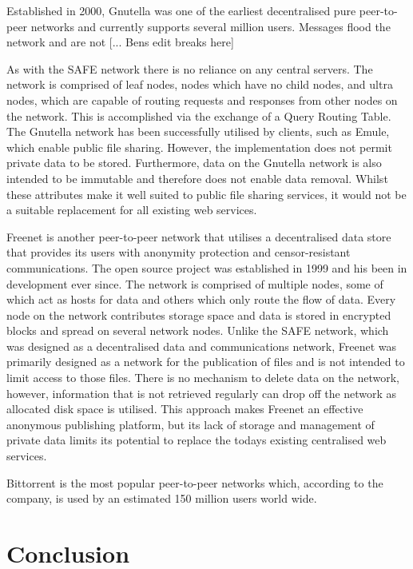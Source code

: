 \documentclass[twocolumn,english]{article}
\begin{document}
Established in 2000, Gnutella was one of the earliest decentralised pure peer-to-peer networks and currently supports several million users.  Messages flood the network and are not [... Bens edit breaks here]

As with the SAFE network there is no
reliance on any central servers. The network is comprised of leaf nodes, nodes which have no child nodes, and ultra nodes, which are capable of routing requests and responses
from other nodes on the network.  This is accomplished via the exchange of a Query Routing Table. 
The Gnutella network has been successfully utilised by clients, such as Emule, which enable public file sharing. However, the implementation does not permit private data to be stored. 
Furthermore, data on the Gnutella network is also intended to be immutable and therefore does not enable data removal. Whilst these attributes make it well suited to public file
sharing services, it would not be a suitable replacement for all existing web services.

Freenet is another peer-to-peer network that utilises a decentralised data store that provides its users with anonymity protection and censor-resistant communications. The open source
project was established in 1999 and his been in development ever since. The network is comprised of multiple nodes, some of which act as hosts for data and others which only route the 
flow of data. Every node on the network contributes storage space and data is stored in encrypted blocks and spread on several network nodes. 
Unlike the SAFE network, which was designed as a decentralised data and communications network, Freenet was primarily designed as a network for the publication of files and is not 
intended to limit access to those files. There is no mechanism to delete data on the network, however, information that is not retrieved regularly can drop off the network as allocated disk 
space is utilised. This approach makes Freenet an effective anonymous publishing platform, but its lack of storage and management of private data limits its potential to replace the todays
existing centralised web services. 

Bittorrent is the most popular peer-to-peer networks which, according to the company, is used by an estimated 150 million users world wide.

\section*{Conclusion}
\end{document}
